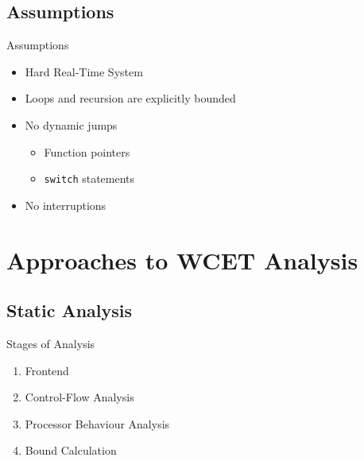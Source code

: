 \documentclass{beamer}
\begin{document}
\subsection{Assumptions}

\begin{frame}{Assumptions}
  \pause
  \begin{itemize}
    \item Hard Real-Time System \pause
    \item Loops and recursion are explicitly bounded \pause
    \item No dynamic jumps
      \begin{itemize}
        \item Function pointers
        \item \texttt{switch} statements
      \end{itemize}
      \pause
    \item No interruptions
  \end{itemize}
\end{frame}

\section{Approaches to WCET Analysis}

\subsection{Static Analysis}
\begin{frame}{Stages of Analysis}
  \begin{enumerate}
    \item Frontend
    \item Control-Flow Analysis
    \item Processor Behaviour Analysis
    \item Bound Calculation
  \end{enumerate}
\end{frame}
\end{document}
